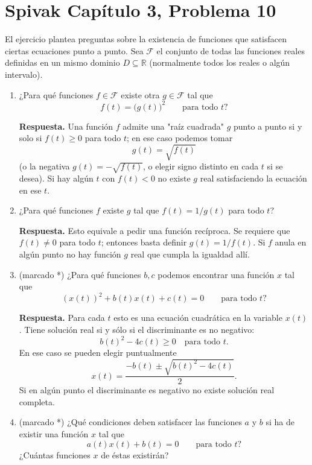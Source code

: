 \section*{Spivak Capítulo 3, Problema 10}

El ejercicio plantea preguntas sobre la existencia de funciones que satisfacen ciertas ecuaciones punto a punto. Sea $\mathcal{F}$ el conjunto de todas las funciones reales definidas en un mismo dominio $D\subseteq\mathbb{R}$ (normalmente todos los reales o algún intervalo).

\begin{enumerate}[label=(\alph*)]
\item ¿Para qué funciones $f\in\mathcal{F}$ existe otra $g\in\mathcal{F}$ tal que
$$f(t)=\bigl(g(t)\bigr)^2\qquad\text{para todo }t?$$

\textbf{Respuesta.} Una función $f$ admite una "raíz cuadrada" $g$ punto a punto si y solo si $f(t)\ge0$ para todo $t$; en ese caso podemos tomar
$$g(t)=\sqrt{f(t)}$$
(o la negativa $g(t)=-\sqrt{f(t)}$, o elegir signo distinto en cada $t$ si se desea). Si hay algún $t$ con $f(t)<0$ no existe $g$ real satisfaciendo la ecuación en ese $t$.

\item ¿Para qué funciones $f$ existe $g$ tal que $f(t)=1/g(t)$ para todo $t$?

\textbf{Respuesta.} Esto equivale a pedir una función recíproca. Se requiere que $f(t)\neq0$ para todo $t$; entonces basta definir $g(t)=1/f(t)$. Si $f$ anula en algún punto no hay función $g$ real que cumpla la igualdad allí.

\item (marcado *) ¿Para qué funciones $b,c$ podemos encontrar una función $x$ tal que
$$(x(t))^2+b(t)x(t)+c(t)=0\qquad\text{para todo }t?$$

\textbf{Respuesta.} Para cada $t$ esto es una ecuación cuadrática en la variable $x(t)$. Tiene solución real si y sólo si el discriminante es no negativo:
$$b(t)^2-4c(t)\ge0\quad\text{para todo }t.$$  En ese caso se pueden elegir puntualmente
$$x(t)=\frac{-b(t)\pm\sqrt{b(t)^2-4c(t)}}2.$$  Si en algún punto el discriminante es negativo no existe solución real completa.

\item (marcado *) ¿Qué condiciones deben satisfacer las funciones $a$ y $b$ si ha de existir una función $x$ tal que
$$a(t)x(t)+b(t)=0\qquad\text{para todo }t?$$
¿Cuántas funciones $x$ de éstas existirán?


\end{enumerate}
